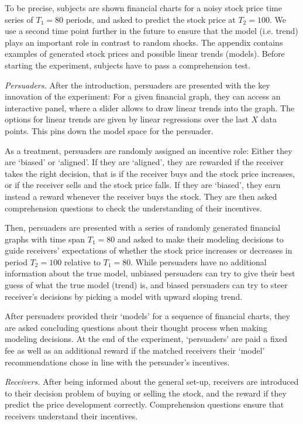 \documentclass[11pt, a4paper, leqno]{article}
\begin{document}
To be precise, subjects are shown financial charts for a noisy stock price time series of $T_1=80$ periods, and asked to predict the stock price at $T_2=100$. We use a second time point further in the future to ensure that the model (i.e. trend) plays an important role in contrast to random shocks. The appendix contains examples of generated stock prices and possible linear trends (models). Before starting the experiment, subjects have to pass a comprehension test.

\textit{Persuaders.} After the introduction, persuaders are presented with the key innovation of the experiment: For a given financial graph, they can access an interactive panel, where a slider allows to draw linear trends into the graph. The options for linear trends are given by linear regressions over the last $X$ data points. This pins down the model space for the persuader. 

As a treatment, persuaders are randomly assigned an incentive role: Either they are `biased' or `aligned'. If they are `aligned', they are rewarded if the receiver takes the right decision, that is if the receiver buys and the stock price increases, or if the receiver sells and the stock price falls. If they are `biased', they earn instead a reward whenever the receiver buys the stock. They are then asked comprehension questions to check the understanding of their incentives.

Then, persuaders are presented with a series of randomly generated financial graphs with time span $T_1 = 80$ and asked to make their modeling decisions to guide receivers' expectations of whether the stock price increases or decreases in period $T_2=100$ relative to $T_1 = 80$. While persuaders have no additional information about the true model, unbiased persuaders can try to give their best guess of what the true model (trend) is, and biased persuaders can try to steer receiver's decisions by picking a model with upward sloping trend.

After persuaders provided their `models' for a sequence of financial charts, they are asked concluding questions about their thought process when making modeling decisions. At the end of the experiment, `persuaders' are paid a fixed fee as well as an additional reward if the matched receivers their `model' recommendations chose in line with the persuader's incentives. 

\textit{Receivers.} After being informed about the general set-up, receivers are introduced to their decision problem of buying or selling the stock, and the reward if they predict the price development correctly. Comprehension questions ensure that receivers understand their incentives.
\end{document}

